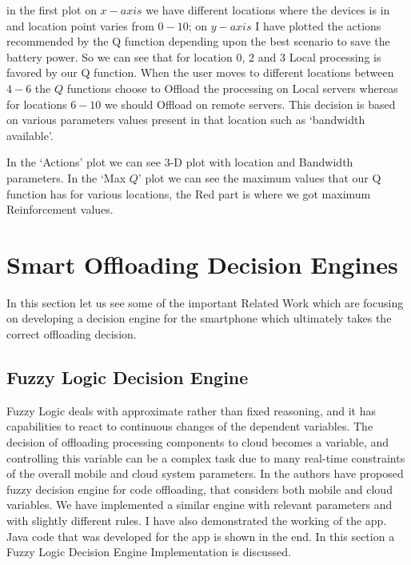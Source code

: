 \documentclass[12pt]{report}
\begin{document}
in the first plot on $x-axis$ we have different locations where the devices is in and location point varies from $0-10$; on $y-axis$ I have plotted the actions recommended by the Q function depending upon the best scenario to save the battery power. So we can see that for location 0, 2 and 3 Local processing is favored by our Q function. When the user moves to different locations between $4-6$ the $Q$ functions choose to Offload the processing on Local servers whereas for locations $6-10$ we should Offload on remote servers. This decision is based on various parameters values present in that location such as `bandwidth available'. \par
In the `Actions' plot we can see 3-D plot with location and Bandwidth parameters. In the `Max $Q$' plot we can see the maximum values that our Q function has for various locations, the Red part is where we got maximum Reinforcement values. 






\chapter{Smart Offloading Decision Engines} %
In this section let us see some of the important Related Work which are focusing on developing a decision engine for the smartphone which ultimately takes the correct offloading decision.
\section{Fuzzy Logic Decision Engine}
Fuzzy Logic deals with approximate rather than fixed reasoning, and it has capabilities to react to continuous changes of the dependent variables. The decision of offloading processing components to cloud becomes a variable, and controlling this variable can be a complex task due to many real-time constraints of the overall mobile and cloud system parameters.
In \cite{flores2013adaptive} the authors have proposed fuzzy decision engine for code offloading, that considers both mobile and cloud variables. We have implemented a similar engine with relevant parameters and with slightly different rules. 
I have also demonstrated the working of the app. Java code that was developed for the app is shown in the end.
In this section a Fuzzy Logic Decision Engine Implementation is discussed.
\end{document}
